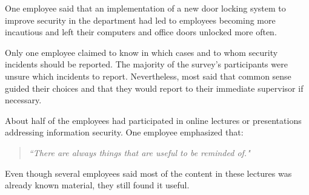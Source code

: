 One employee said that an implementation of a new door locking system to improve security in the department had led to employees becoming more incautious and left their computers and office doors unlocked more often.

Only one employee claimed to know in which cases and to whom security incidents should be reported. The majority of the survey's participants were unsure which incidents to report. Nevertheless, most said that common sense guided their choices and that they would report to their immediate supervisor if necessary.

About half of the employees had participated in online lectures or presentations addressing information security. One employee emphasized that:

\begin{quote}
\textit{``There are always things that are useful to be reminded of."}
\end{quote}

Even though several employees said most of the content in these lectures was already known material, they still found it useful.